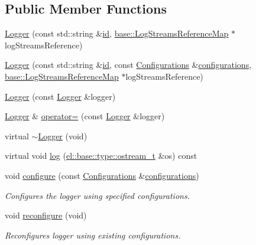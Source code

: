 \subsection*{Public Member Functions}
\begin{DoxyCompactItemize}
\item 
\hyperlink{classel_1_1_logger_a59b1c5a0f8c5c670e59d2f69f9e39fbb}{Logger} (const std\+::string \&\hyperlink{classel_1_1_logger_ae51a621df3c835f51f450134ba66f8ac}{id}, \hyperlink{namespaceel_1_1base_af7602da9fe1d6c75985184fb0e39fd11}{base\+::\+Log\+Streams\+Reference\+Map} $\ast$log\+Streams\+Reference)
\item 
\hyperlink{classel_1_1_logger_a43abea8865d7316f05c8a676a8c04896}{Logger} (const std\+::string \&\hyperlink{classel_1_1_logger_ae51a621df3c835f51f450134ba66f8ac}{id}, const \hyperlink{classel_1_1_configurations}{Configurations} \&\hyperlink{classel_1_1_logger_aeb57aeaddbb3dcd0cb96114019817142}{configurations}, \hyperlink{namespaceel_1_1base_af7602da9fe1d6c75985184fb0e39fd11}{base\+::\+Log\+Streams\+Reference\+Map} $\ast$log\+Streams\+Reference)
\item 
\hyperlink{classel_1_1_logger_a984de07936a8c783e91496dfa6df69ea}{Logger} (const \hyperlink{classel_1_1_logger}{Logger} \&logger)
\item 
\hyperlink{classel_1_1_logger}{Logger} \& \hyperlink{classel_1_1_logger_a2bfb4ed37f3281a701f20fb21a4cac62}{operator=} (const \hyperlink{classel_1_1_logger}{Logger} \&logger)
\item 
virtual \hyperlink{classel_1_1_logger_ae285e82b96ffcbe715ed1f9e51f2f86e}{$\sim$\+Logger} (void)
\item 
virtual void \hyperlink{classel_1_1_logger_a12e1e5f6f91bad8d6a71c3918f09b672}{log} (\hyperlink{namespaceel_1_1base_1_1type_a74ea109bf34d1c44926837fb0830f445}{el\+::base\+::type\+::ostream\+\_\+t} \&os) const 
\item 
void \hyperlink{classel_1_1_logger_ad9db621dbf8977bf814dc7baea8dcee4}{configure} (const \hyperlink{classel_1_1_configurations}{Configurations} \&\hyperlink{classel_1_1_logger_aeb57aeaddbb3dcd0cb96114019817142}{configurations})
\begin{DoxyCompactList}\small\item\em Configures the logger using specified configurations. \end{DoxyCompactList}\item 
void \hyperlink{classel_1_1_logger_adfd57ab27fb398cc980a3edfab92927e}{reconfigure} (void)
\begin{DoxyCompactList}\small\item\em Reconfigures logger using existing configurations. \end{DoxyCompactList}\item 

\end{DoxyCompactItemize}
